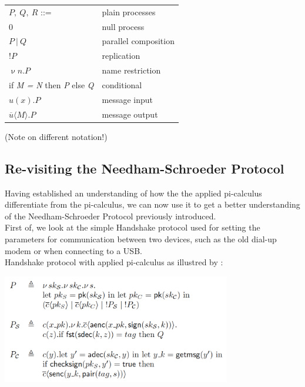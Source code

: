 \begin{center}
	\begin{tabular} { l l }
 		$P,\ Q,\ R$ ::= & plain processes \\ 
 		0 & null process \\  
 		$P\ |\ Q$ & parallel composition \\
 		!$P$ & replication \\
		$\upnu n.P$ & name restriction \\
		if \textit{M = N} then \textit{P} else \textit{Q} & conditional \\
		$u(x).P$ & message input \\
		$\overline{u}\langle M\rangle .P $ & message output 
	\end{tabular}
\end{center}
(Note on different notation!)

\subsection{Re-visiting the Needham-Schroeder Protocol}
Having established an understanding of how the the applied pi-calculus differentiate from the pi-calculus, we can now use it to get a better understanding of the Needham-Schroeder Protocol previously introduced.\\

First of, we look at the simple Handshake protocol used for setting the parameters for communication between two devices, such as the old dial-up modem or when connecting to a USB.  \\
Handshake protocol with applied pi-calculus as illustred by \citeauthor{AplliedPiCalsulus2010}:
\begin{center}
\includegraphics[width=0.75\textwidth, angle=0]{Graphics/Handshake.pdf}
\end{center}

